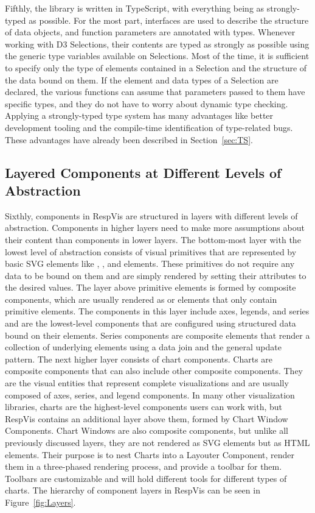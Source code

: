 Fifthly, the library is written in TypeScript, with everything being
as strongly-typed as possible.  For the most part, interfaces are used
to describe the structure of data objects, and function parameters are
annotated with types.  Whenever working with D3 Selections, their
contents are typed as strongly as possible using the generic type
variables available on Selections.  Most of the time, it is sufficient
to specify only the type of elements contained in a Selection and the
structure of the data bound on them.  If the element and data types of
a Selection are declared, the various functions can assume that
parameters passed to them have specific types, and they do not have to
worry about dynamic type checking.  Applying a strongly-typed type
system has many advantages like better development tooling and the
compile-time identification of type-related bugs.  These advantages
have already been described in Section~\ref{sec:TS}.



\subsection{Layered Components at Different Levels of Abstraction}

Sixthly, components in RespVis are structured in layers with different
levels of abstraction.  Components in higher layers need to make more
assumptions about their content than components in lower layers.  The
bottom-most layer with the lowest level of abstraction consists of
visual primitives that are represented by basic SVG elements like
, , and  elements.  These
primitives do not require any data to be bound on them and are simply
rendered by setting their attributes to the desired values.  The layer
above primitive elements is formed by composite components, which are
usually rendered as  or  elements that only
contain primitive elements.  The components in this layer include
axes, legends, and series and are the lowest-level components that are
configured using structured data bound on their elements.  Series
components are composite elements that render a collection of
underlying elements using a data join and the general update pattern.
The next higher layer consists of chart components.  Charts are
composite components that can also include other composite components.
They are the visual entities that represent complete visualizations
and are usually composed of axes, series, and legend components.  In
many other visualization libraries, charts are the highest-level
components users can work with, but RespVis contains an additional
layer above them, formed by Chart Window Components.  Chart Windows
are also composite components, but unlike all previously discussed
layers, they are not rendered as SVG elements but as HTML 
elements.  Their purpose is to nest Charts into a Layouter Component,
render them in a three-phased rendering process, and provide a toolbar
for them.  Toolbars are customizable and will hold different tools for
different types of charts.  The hierarchy of component layers in
RespVis can be seen in Figure~\ref{fig:Layers}.


